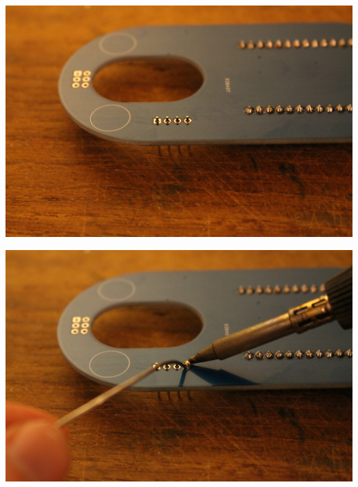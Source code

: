 \documentclass{article}
\begin{document}
\vspace{0.5cm}

\begin{minipage}[b]{0.5\textwidth}
	\includegraphics[width=\textwidth]{Bilder2019/IMG_6475.JPG}
\end{minipage}
\begin{minipage}[b]{0.5\textwidth}
	\includegraphics[width=\textwidth]{Bilder2019/IMG_6476.JPG}
\end{minipage}

\vspace{0.5cm}
\end{document}
